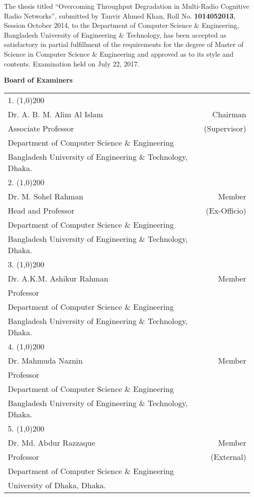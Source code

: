  \newpage
 { \singlespacing
 The thesis titled ``Overcoming Throughput Degradation in Multi-Radio Cognitive Radio Networks'', submitted by Tanvir Ahmed Khan, Roll No. \textbf{1014052013}, Session October 2014, to the Department of Computer Science \& Engineering, Bangladesh University of Engineering \& Technology, has been accepted as satisfactory in partial fulfillment of the requirements for the degree of Master of Science in Computer Science \& Engineering and approved as to its style and contents. Examination held on July 22, 2017. \\
 \begin{center}
 	\textbf{\Large Board of Examiners}
 \end{center}
 \begin{tabular}{p{12cm} r }
 	\vspace{0.8cm}
 	1. \line(1,0){200} &  \\
 	Dr. A. B. M. Alim Al Islam & Chairman\\ 
 	Associate Professor & (Supervisor)\\
 	Department of Computer Science \& Engineering & \\
 	Bangladesh University of Engineering \& Technology, Dhaka. & \\
 	\vspace{0.8cm}
 	2. \line(1,0){200} &  \\
 	Dr. M. Sohel Rahman  & Member \\ 
 	Head and Professor & (Ex-Officio)\\
 	Department of Computer Science \& Engineering & \\
 	Bangladesh University of Engineering \& Technology, Dhaka. & \\
 	\vspace{0.8cm}
 	3. \line(1,0){200} &  \\
 	Dr. A.K.M. Ashikur Rahman & Member\\ 
 	Professor &\\
 	Department of Computer Science \& Engineering & \\
 	Bangladesh University of Engineering \& Technology, Dhaka. & \\
 	\vspace{0.8cm}
 	4. \line(1,0){200} &  \\
 	Dr. Mahmuda Naznin & Member\\ 
 	Professor & \\
 	Department of Computer Science \& Engineering & \\
 	Bangladesh University of Engineering \& Technology, Dhaka. & \\
 	\vspace{0.8cm}
 	5. \line(1,0){200} &  \\
 	Dr. Md. Abdur Razzaque & Member\\ 
 	Professor & (External)\\
 	Department of Computer Science \& Engineering & \\
 	University of Dhaka, Dhaka. &\\
 \end{tabular}
 } 
